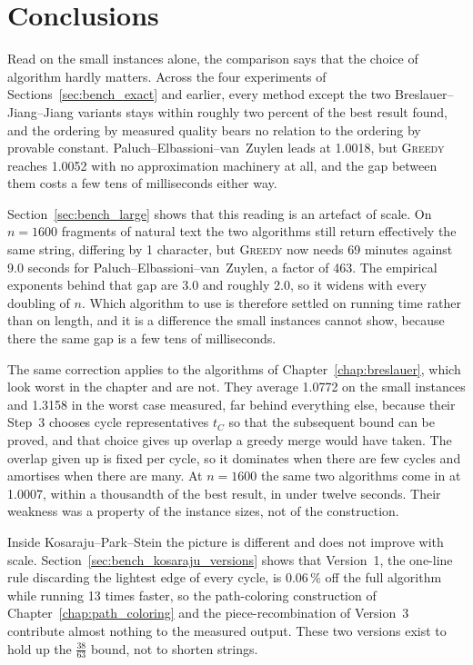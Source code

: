 \section{Conclusions}

Read on the small instances alone, the comparison says that the choice of
algorithm hardly matters. Across the four experiments of
Sections~\ref{sec:bench_exact} and earlier, every method except the two
Breslauer--Jiang--Jiang variants stays within roughly two percent of the
best result found, and the ordering by measured quality bears no relation
to the ordering by provable constant. Paluch--Elbassioni--van~Zuylen leads
at 1.0018, but \textsc{Greedy} reaches 1.0052 with no
approximation machinery at all, and the gap between them costs a few tens
of milliseconds either way.

Section~\ref{sec:bench_large} shows that this reading is an artefact of
scale. On $n = 1600$ fragments of natural text the two algorithms
still return effectively the same string, differing by 1
character, but \textsc{Greedy} now needs 69 minutes against
9.0 seconds for Paluch--Elbassioni--van~Zuylen, a factor of
463. The empirical exponents behind that gap are 3.0
and roughly 2.0, so it widens with every doubling of
$n$. Which algorithm to use is therefore settled on running time rather
than on length, and it is a difference the small instances cannot show,
because there the same gap is a few tens of milliseconds.

The same correction applies to the algorithms of
Chapter~\ref{chap:breslauer}, which look worst in the chapter and are not.
They average 1.0772 on the small instances and 1.3158 in the
worst case measured, far behind everything else, because their Step~3
chooses cycle representatives $t_C$ so that the subsequent bound can be
proved, and that choice gives up overlap a greedy merge would have taken.
The overlap given up is fixed per cycle, so it dominates when there are few
cycles and amortises when there are many. At $n = 1600$ the same two
algorithms come in at 1.0007, within a thousandth of the best
result, in under twelve seconds. Their weakness was a property of the
instance sizes, not of the construction.

Inside Kosaraju--Park--Stein the picture is different and does not improve
with scale. Section~\ref{sec:bench_kosaraju_versions} shows that Version~1,
the one-line rule discarding the lightest edge of every cycle, is
0.06\,\% off the full algorithm while running 13
times faster, so the path-coloring construction of
Chapter~\ref{chap:path_coloring} and the piece-recombination of Version~3
contribute almost nothing to the measured output. These two versions exist
to hold up the $\frac{38}{63}$ bound, not to shorten strings.

